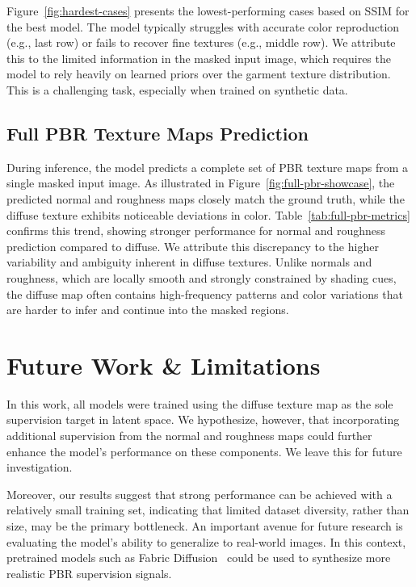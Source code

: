 \documentclass[11pt,twocolumn]{article}
\begin{document}
Figure~\ref{fig:hardest-cases} presents the lowest-performing cases based on SSIM for the 
best model. The model typically struggles with accurate color reproduction (e.g., last row) 
or fails to recover fine textures (e.g., middle row). We attribute this to the limited 
information in the masked input image, which requires the model to rely heavily on 
learned priors over the garment texture distribution. This is a challenging task, 
especially when trained on synthetic data.

\subsection{Full PBR Texture Maps Prediction}

During inference, the model predicts a complete set of PBR texture maps from a single masked input image. As illustrated in Figure~\ref{fig:full-pbr-showcase}, the predicted normal and roughness maps closely match the ground truth, while the diffuse texture exhibits noticeable deviations in color. Table~\ref{tab:full-pbr-metrics} confirms this trend, showing stronger performance for normal and roughness prediction compared to diffuse. We attribute this discrepancy to the higher variability and ambiguity inherent in diffuse textures. Unlike normals and roughness, which are locally smooth and strongly constrained by shading cues, the diffuse map often contains high-frequency patterns and color variations that are harder to infer and continue into the masked regions.

\section{Future Work \& Limitations}
In this work, all models were trained using the diffuse texture map as the sole supervision target in 
latent space. We hypothesize, however, that incorporating additional supervision from the normal and 
roughness maps could further enhance the model's performance on these components. 
We leave this for future investigation.

Moreover, our results suggest that strong performance can be achieved with a relatively small training set, 
indicating that limited dataset diversity, rather than size, may be the primary bottleneck. 
An important avenue for future research is evaluating the model's ability to generalize to real-world images. In this context, pretrained models such as Fabric Diffusion~\cite{fabricdiffusion} could be used to synthesize more realistic PBR supervision signals.
\end{document}
